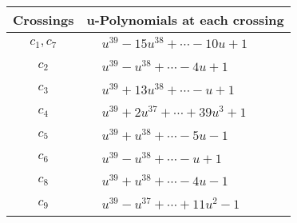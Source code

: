 \documentclass[1p]{elsarticle_modified}
\theoremstyle{definition}
\begin{document}
\begin{tabular}{m{50pt}|m{274pt}}
Crossings & \hspace{64pt}u-Polynomials at each crossing \\
\hline $$\begin{aligned}c_{1},c_{7}\end{aligned}$$&$\begin{aligned}
&u^{39}-15 u^{38}+\cdots-10 u+1
\end{aligned}$\\
\hline $$\begin{aligned}c_{2}\end{aligned}$$&$\begin{aligned}
&u^{39}- u^{38}+\cdots-4 u+1
\end{aligned}$\\
\hline $$\begin{aligned}c_{3}\end{aligned}$$&$\begin{aligned}
&u^{39}+13 u^{38}+\cdots- u+1
\end{aligned}$\\
\hline $$\begin{aligned}c_{4}\end{aligned}$$&$\begin{aligned}
&u^{39}+2 u^{37}+\cdots+39 u^3+1
\end{aligned}$\\
\hline $$\begin{aligned}c_{5}\end{aligned}$$&$\begin{aligned}
&u^{39}+u^{38}+\cdots-5 u-1
\end{aligned}$\\
\hline $$\begin{aligned}c_{6}\end{aligned}$$&$\begin{aligned}
&u^{39}- u^{38}+\cdots- u+1
\end{aligned}$\\
\hline $$\begin{aligned}c_{8}\end{aligned}$$&$\begin{aligned}
&u^{39}+u^{38}+\cdots-4 u-1
\end{aligned}$\\
\hline $$\begin{aligned}c_{9}\end{aligned}$$&$\begin{aligned}
&u^{39}- u^{37}+\cdots+11 u^2-1
\end{aligned}$\\

\end{tabular}
\end{document}
